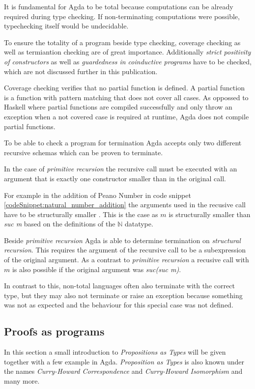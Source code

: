 It is fundamental for Agda to be total because computations can be already required during type checking.
If non-terminating computations were possible, typechecking itself would be undecidable\cite{agda_wiki_totality}.

To ensure the totality of a program beside type checking, coverage checking as well as termiantion checking are of great importance. 
Additionally \emph{strict positivity of constructors} as well as \emph{guardedness in coinductive programs} have to be checked, which are not discussed further in this publication.

Coverage checking verifies that no partial function is defined. A partial function is a function with pattern matching that does not cover all cases.
As oppossed to Haskell where partial functions are compiled successfully and only throw an exception when a not covered case is required at runtime, Agda does not compile partial functions.

To be able to check a program for termination Agda accepts only two different recursive schemas which can be proven to terminate.

In the case of \emph{primitive recursion} the recursive call must be executed with an argument that is exactly one constructor smaller than in the original call.

For example in the addition of Peano Number in code snippet \ref{codeSnippet:natural_number_addition} the arguments used in the recusive call have to be structurally smaller \cite{norell:deptyped}. 
This is the case as $m$ is structurally smaller than \emph{suc m} based on the definitions of the $\mathbb{N}$ datatype.

Beside \emph{primitive recursion} Agda is able to determine termination on \emph{structural recursion}.
This requires the argument of the recursive call to be a subexpression of the original argument.
As a contrast to \emph{primitive recursion} a recusive call with $m$ is also possible if the original argument was \emph{suc(suc m)}.

In contrast to this, non-total languages often also terminate with the correct type, but they may also not terminate or raise an exception because something was not as expected and the behaviour for this special case was not defined.

\subsection{Proofs as programs}\label{section:agda_proofs}
In this section a small introduction to \emph{Propositions as Types}\cite{10.1145/2699407} will be given together with a few example in Agda. \emph{Proposition as Types} is also known under the names \emph{Curry-Howard Correspondence}\cite{10.5555/1076265} and \emph{Curry-Howard Isomorphism}\cite{10.1145/2841316} and many more.

